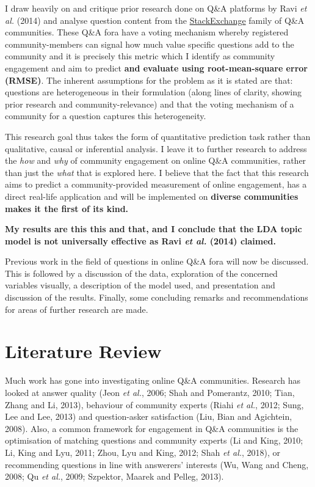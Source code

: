 \documentclass[11pt,preprint, authoryear]{article}
\numberwithin{equation}{section}
\numberwithin{figure}{section}
\begin{document}
I draw heavily on and critique prior research done on Q\&A platforms by
Ravi \emph{et al.} (2014) and analyse question content from the
\href{https://stackexchange.com/sites\#}{StackExchange} family of Q\&A
communities. These Q\&A fora have a voting mechanism whereby registered
community-members can signal how much value specific questions add to
the community and it is precisely this metric which I identify as
community engagement and aim to predict \textbf{and evaluate using
root-mean-square error (RMSE)}. The inherent assumptions for the problem
as it is stated are that: questions are heterogeneous in their
formulation (along lines of clarity, showing prior research and
community-relevance) and that the voting mechanism of a community for a
question captures this heterogeneity.

This research goal thus takes the form of quantitative prediction task
rather than qualitative, causal or inferential analysis. I leave it to
further research to address the \emph{how} and \emph{why} of community
engagement on online Q\&A communities, rather than just the \emph{what}
that is explored here. I believe that the fact that this research aims
to predict a community-provided measurement of online engagement, has a
direct real-life application and will be implemented on \textbf{diverse
communities makes it the first of its kind.}

\textbf{My results are this this and that, and I conclude that the LDA
topic model is not universally effective as Ravi \emph{et al.} (2014)
claimed.}

Previous work in the field of questions in online Q\&A fora will now be
discussed. This is followed by a discussion of the data, exploration of
the concerned variables visually, a description of the model used, and
presentation and discussion of the results. Finally, some concluding
remarks and recommendations for areas of further research are made.

\newpage

\section{\texorpdfstring{Literature Review
\label{Lit}}{Literature Review }}\label{literature-review}

\color{blue}

Much work has gone into investigating online Q\&A communities. Research
has looked at answer quality (Jeon \emph{et al.}, 2006; Shah and
Pomerantz, 2010; Tian, Zhang and Li, 2013), behaviour of community
experts (Riahi \emph{et al.}, 2012; Sung, Lee and Lee, 2013) and
question-asker satisfaction (Liu, Bian and Agichtein, 2008). Also, a
common framework for engagement in Q\&A communities is the optimisation
of matching questions and community experts (Li and King, 2010; Li, King
and Lyu, 2011; Zhou, Lyu and King, 2012; Shah \emph{et al.}, 2018), or
recommending questions in line with answerers' interests (Wu, Wang and
Cheng, 2008; Qu \emph{et al.}, 2009; Szpektor, Maarek and Pelleg, 2013).
\end{document}
